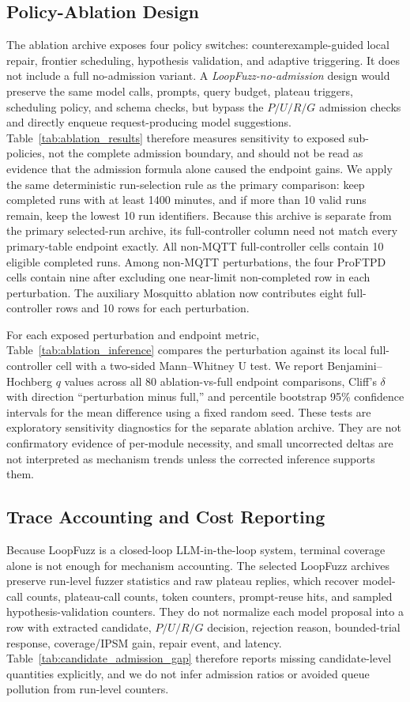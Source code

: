 \documentclass[final,5p,times,number]{elsarticle}
\begin{document}
\subsection{Policy-Ablation Design}
The ablation archive exposes four policy switches: counterexample-guided local repair, frontier scheduling, hypothesis validation, and adaptive triggering. It does not include a full no-admission variant. A \emph{LoopFuzz-no-admission} design would preserve the same model calls, prompts, query budget, plateau triggers, scheduling policy, and schema checks, but bypass the $P/U/R/G$ admission checks and directly enqueue request-producing model suggestions. Table~\ref{tab:ablation_results} therefore measures sensitivity to exposed sub-policies, not the complete admission boundary, and should not be read as evidence that the admission formula alone caused the endpoint gains. We apply the same deterministic run-selection rule as the primary comparison: keep completed runs with at least 1400 minutes, and if more than 10 valid runs remain, keep the lowest 10 run identifiers. Because this archive is separate from the primary selected-run archive, its full-controller column need not match every primary-table endpoint exactly. All non-MQTT full-controller cells contain 10 eligible completed runs. Among non-MQTT perturbations, the four ProFTPD cells contain nine after excluding one near-limit non-completed row in each perturbation. The auxiliary Mosquitto ablation now contributes eight full-controller rows and 10 rows for each perturbation.

For each exposed perturbation and endpoint metric, Table~\ref{tab:ablation_inference} compares the perturbation against its local full-controller cell with a two-sided Mann--Whitney U test. We report Benjamini--Hochberg $q$ values across all 80 ablation-vs-full endpoint comparisons, Cliff's $\delta$ with direction ``perturbation minus full,'' and percentile bootstrap 95\% confidence intervals for the mean difference using a fixed random seed. These tests are exploratory sensitivity diagnostics for the separate ablation archive. They are not confirmatory evidence of per-module necessity, and small uncorrected deltas are not interpreted as mechanism trends unless the corrected inference supports them.

\subsection{Trace Accounting and Cost Reporting}
\label{sec:trace_accounting}
Because LoopFuzz is a closed-loop LLM-in-the-loop system, terminal coverage alone is not enough for mechanism accounting. The selected LoopFuzz archives preserve run-level fuzzer statistics and raw plateau replies, which recover model-call counts, plateau-call counts, token counters, prompt-reuse hits, and sampled hypothesis-validation counters. They do not normalize each model proposal into a row with extracted candidate, $P/U/R/G$ decision, rejection reason, bounded-trial response, coverage/IPSM gain, repair event, and latency. Table~\ref{tab:candidate_admission_gap} therefore reports missing candidate-level quantities explicitly, and we do not infer admission ratios or avoided queue pollution from run-level counters.
\end{document}
